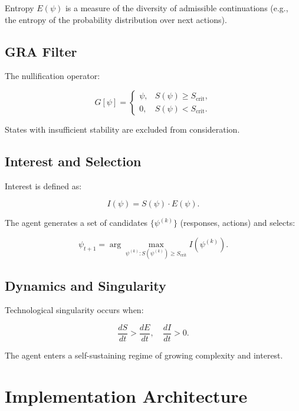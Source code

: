 \documentclass[12pt,a4paper]{article}
\begin{document}
Entropy $E(\psi)$ is a measure of the diversity of admissible continuations (e.g., the entropy of the probability distribution over next actions).

\subsection{GRA Filter}

The nullification operator:

\begin{equation}
\hat{G}[\psi] = \begin{cases}
\psi, & S(\psi) \ge S_{\text{crit}},\\
0, & S(\psi) < S_{\text{crit}}.
\end{cases}
\end{equation}

States with insufficient stability are excluded from consideration.

\subsection{Interest and Selection}

Interest is defined as:

\begin{equation}
I(\psi) = S(\psi) \cdot E(\psi).
\end{equation}

The agent generates a set of candidates $\{\psi^{(k)}\}$ (responses, actions) and selects:

\begin{equation}
\psi_{t+1} = \arg\max_{\psi^{(k)}: S(\psi^{(k)}) \ge S_{\text{crit}}} I(\psi^{(k)}).
\end{equation}

\subsection{Dynamics and Singularity}

Technological singularity occurs when:

\begin{equation}
\frac{dS}{dt} > \frac{dE}{dt}, \quad \frac{dI}{dt} > 0.
\end{equation}

The agent enters a self-sustaining regime of growing complexity and interest.

\section{Implementation Architecture}
\end{document}
